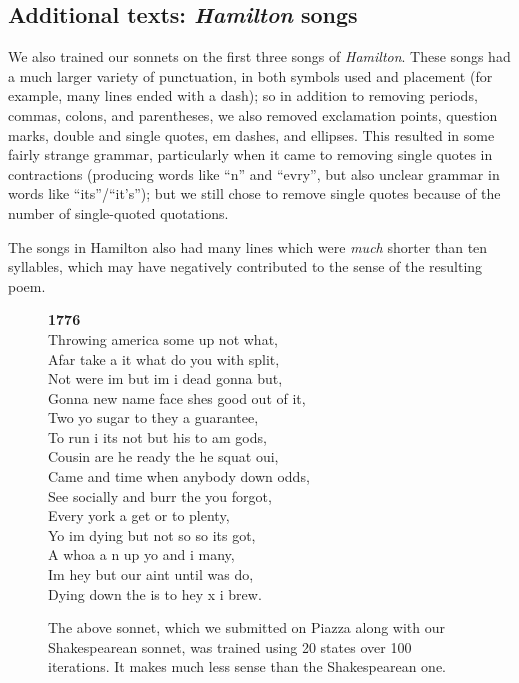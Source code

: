 \subsection{Additional texts: \emph{Hamilton} songs}
We also trained our sonnets on the first three songs of \emph{Hamilton}.  These songs had a much larger variety of punctuation, in both symbols used and placement (for example, many lines ended with a dash); so in addition to removing periods, commas, colons, and parentheses, we also removed exclamation points, question marks, double and single quotes, em dashes, and ellipses.  This resulted in some fairly strange grammar, particularly when it came to removing single quotes in contractions (producing words like ``n'' and ``evry'', but also unclear grammar in words like ``its''/``it's''); but we still chose to remove single quotes because of the number of single-quoted quotations.  

The songs in Hamilton also had many lines which were \emph{much} shorter than ten syllables, which may have negatively contributed to the sense of the resulting poem.

\begin{figure}[h!]
	\begin{center}
{\bf 1776}\\
Throwing america some up not what, \\
Afar take a it what do you with split, \\
Not were im but im i dead gonna but,  \\
Gonna new name face shes good out of it, \\
Two yo sugar to they a guarantee,  \\
To run i its not but his to am gods,  \\
Cousin are he ready the he squat oui,  \\
Came and time when anybody down odds, \\
See socially and burr the you forgot,  \\
Every york a get or to plenty,  \\
Yo im dying but not so so its got,  \\
A whoa a n up yo and i many, \\
Im hey but our aint until was do,  \\
Dying down the is to hey x i brew. 
	\end{center}
	\caption{
		The above sonnet, which we submitted on Piazza along with our Shakespearean sonnet, was trained using 20 states over 100 iterations.  It makes much less sense than the Shakespearean one.
	}
\end{figure}



